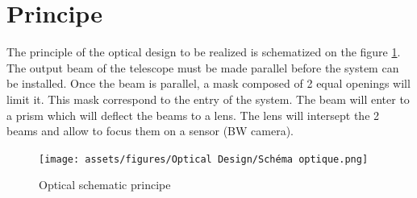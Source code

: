 \section{Principe}
The principle of the optical design to be realized is schematized on the figure \ref{fig:OpticalPrincipe}.\bigbreak
The output beam of the telescope must be made parallel before the system can be installed. Once the beam is parallel,
a mask composed of 2 equal openings will limit it. This mask correspond to the entry of the system.\newline
The beam will enter to a prism which will deflect the beams to a lens.
The lens will intersept the 2 beams and allow to focus them on a sensor (BW camera).
\begin{figure}[H]
    \centering
    \texttt{[image: assets/figures/Optical Design/Schéma optique.png]}
    \caption{Optical schematic principe}
    \label{fig:OpticalPrincipe}
\end{figure}
\newpage
